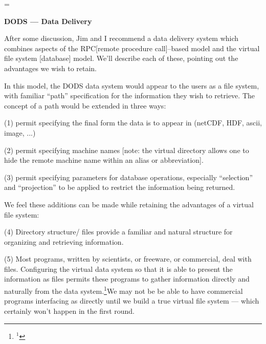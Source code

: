 
%

\magnification=
\raggedbottom
\def\title#1{\bigskip\goodbreak\centerline{\bf #1}\medskip}
\def\section#1{\medskip\goodbreak\noindent{\bf #1}\medskip}
\def\subsection#1{\medskip\goodbreak\noindent{\sl #1}\medskip}
\def\references{\narrower\parindent=-20pt}
\def\jour#1#2{{\sl #1}, {\bf #2}}
\def\ni{\noindent}
\def\nobox{\special{ps::/v{pop pop pop pop}def}}

\title{DODS --- Data Delivery}

After some discussion, Jim and I recommend a data delivery system
which combines aspects of the RPC[remote procedure call]--based model
and the virtual file system [database] model. We'll describe each of
these, pointing out the advantages we wish to retain.

\section{Virtual file system}

In this model, the DODS data system would appear to the users as a file
system, with familiar ``path'' specification for the information they
wish to retrieve. The concept of a path would be extended in three
ways: 
\item{(1)} permit specifying the final form the data is to appear in
(netCDF, HDF, ascii, image, ...)  
\item{(2)} permit specifying machine names [note: the virtual
directory allows one to hide the remote machine name within an alias
or abbreviation].
\item{(3)} permit specifying parameters for database operations,
especially ``selection'' and ``projection'' to be applied to restrict
the information being returned.

\ni We feel these additions can be made while retaining the advantages
of a virtual file system:
\item{(4)} Directory structure/ files provide a familiar and natural
structure for organizing and retrieving information.
\item{(5)} Most programs, written by scientists, or freeware, or
commercial, deal with files. Configuring the virtual data system so
that it is able to present the information as files permits these
programs to gather information directly and naturally from the data
system.\footnote{${}^1$}{We may not be be able to have commercial
programs interfacing as directly until we build a true virtual file
system --- which certainly won't happen in the first round.}

